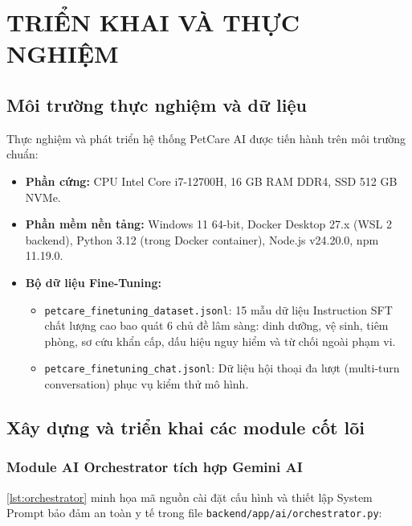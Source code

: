 
\chapter{TRIỂN KHAI VÀ THỰC NGHIỆM}
\label{chap:trienkhai}

\section{Môi trường thực nghiệm và dữ liệu}
\label{sec:moitruong}

Thực nghiệm và phát triển hệ thống PetCare AI được tiến hành trên môi trường chuẩn:
\begin{itemize}[leftmargin=1.5cm]
    \item \textbf{Phần cứng:} CPU Intel Core i7-12700H, 16 GB RAM DDR4, SSD 512 GB NVMe.
    \item \textbf{Phần mềm nền tảng:} Windows 11 64-bit, Docker Desktop 27.x (WSL 2 backend), Python 3.12 (trong Docker container), Node.js v24.20.0, npm 11.19.0.
    \item \textbf{Bộ dữ liệu Fine-Tuning:} 
    \begin{itemize}
        \item \texttt{petcare\_finetuning\_dataset.jsonl}: 15 mẫu dữ liệu Instruction SFT chất lượng cao bao quát 6 chủ đề lâm sàng: dinh dưỡng, vệ sinh, tiêm phòng, sơ cứu khẩn cấp, dấu hiệu nguy hiểm và từ chối ngoài phạm vi.
        \item \texttt{petcare\_finetuning\_chat.jsonl}: Dữ liệu hội thoại đa lượt (multi-turn conversation) phục vụ kiểm thử mô hình.
    \end{itemize}
\end{itemize}

\section{Xây dựng và triển khai các module cốt lõi}
\label{sec:huanluyen}

\subsection{Module AI Orchestrator tích hợp Gemini AI}

\cref{lst:orchestrator} minh họa mã nguồn cài đặt cấu hình và thiết lập System Prompt bảo đảm an toàn y tế trong file \texttt{backend/app/ai/orchestrator.py}:


